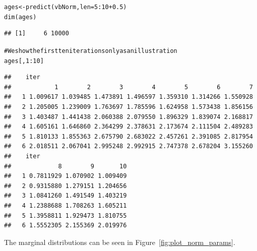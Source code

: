 \documentclass[a4paper,english,10pt]{article}\usepackage[]{graphicx}\usepackage[]{color}
\makeatletter
\newcommand{\hlnum}[1]{\textcolor[rgb]{0.063,0.58,0.627}{#1}}%
\newcommand{\hlcom}[1]{\textcolor[rgb]{0.588,0.588,0.588}{#1}}%
\newcommand{\hlopt}[1]{\textcolor[rgb]{0.196,0.196,0.196}{#1}}%
\newcommand{\hlstd}[1]{\textcolor[rgb]{0.196,0.196,0.196}{#1}}%
\newcommand{\hlkwb}[1]{\textcolor[rgb]{0.627,0,0.314}{#1}}%
\newcommand{\hlkwc}[1]{\textcolor[rgb]{0,0.631,0.314}{#1}}%
\newcommand{\hlkwd}[1]{\textcolor[rgb]{0.78,0.227,0.412}{#1}}%
\newenvironment{kframe}{%
 \def\at@end@of@kframe{}%
 \ifinner\ifhmode%
  \def\at@end@of@kframe{\end{minipage}}%
  \begin{minipage}{\columnwidth}%
 \fi\fi%
 \def\FrameCommand##1{\hskip\@totalleftmargin \hskip-\fboxsep
 \colorbox{shadecolor}{##1}\hskip-\fboxsep
     \hskip-\linewidth \hskip-\@totalleftmargin \hskip\columnwidth}%
 \MakeFramed {\advance\hsize-\width
   \@totalleftmargin\z@ \linewidth\hsize
   \@setminipage}}%
 {\par\unskip\endMakeFramed%
 \at@end@of@kframe}
\newenvironment{knitrout}{}{} %
\makeatother
\begin{document}
\begin{knitrout}
\color{fgcolor}\begin{kframe}
\begin{alltt}
\hlstd{ages} \hlkwb{<-} \hlkwd{predict}\hlstd{(vbNorm,} \hlkwc{len} \hlstd{=} \hlnum{5}\hlopt{:}\hlnum{10} \hlopt{+} \hlnum{0.5}\hlstd{)}
\hlkwd{dim}\hlstd{(ages)}
\end{alltt}
\begin{verbatim}
## [1]     6 10000
\end{verbatim}
\begin{alltt}
\hlcom{# We show the first ten iterations only as an illustration}
\hlstd{ages[,} \hlnum{1}\hlopt{:}\hlnum{10}\hlstd{]}
\end{alltt}
\begin{verbatim}
##    iter
##            1        2        3        4        5        6        7
##   1 1.009617 1.039485 1.473891 1.496597 1.359310 1.314266 1.550928
##   2 1.205005 1.239009 1.763697 1.785596 1.624958 1.573438 1.856156
##   3 1.403487 1.441438 2.060388 2.079550 1.896329 1.839074 2.168817
##   4 1.605161 1.646860 2.364299 2.378631 2.173674 2.111504 2.489283
##   5 1.810133 1.855363 2.675790 2.683022 2.457261 2.391085 2.817954
##   6 2.018511 2.067041 2.995248 2.992915 2.747378 2.678204 3.155260
##    iter
##             8        9       10
##   1 0.7811929 1.070902 1.009409
##   2 0.9315880 1.279151 1.204656
##   3 1.0841260 1.491549 1.403219
##   4 1.2388688 1.708263 1.605211
##   5 1.3958811 1.929473 1.810755
##   6 1.5552305 2.155369 2.019976
\end{verbatim}
\end{kframe}
\end{knitrout}

The marginal distributions can be seen in Figure~\ref{fig:plot_norm_params}.
\end{document}
